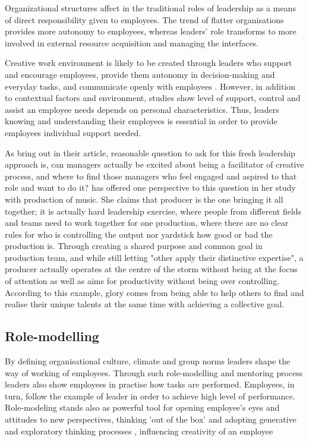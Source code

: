 Organizational structures affect in the traditional roles of leadership as a means of direct responsibility given to employees. The trend of flatter organisations provides more autonomy to employees, whereas leaders' role transforms to more involved in external resource acquisition and managing the interfaces. \citep{shalley2004leaders}

Creative work environment is likely to be created through leaders who support and encourage employees, provide them autonomy in decision-making and everyday tasks, and communicate openly with employees \citep{oldham1996employee,tierney1999examination}. However, in addition to contextual factors and environment, studies show level of support, control and assist an employee needs depends on personal characteristics. Thus, leaders knowing and understanding their employees is essential in order to provide employees individual support needed. \citep{shalley2004leaders}

 As \citet{garvin2008yours} bring out in their article, reasonable question to ask for this fresh leadership approach is, can managers actually be excited about being a facilitator of creative process, and where to find those managers who feel engaged and aspired to that role and want to do it? \citet{lingo2010nexus} has offered one perspective to this question in her study with production of music. She claims that producer is the one bringing it all together; it is actually hard leadership exercise, where people from different fields and teams need to work together for one production, where there are no clear rules for who is controlling the output nor yardstick how good or bad the production is. Through creating a shared purpose and common goal in production team, and while still letting "other apply their distinctive expertise", a producer actually operates at the centre of the storm without being at the focus of attention as well as aims for productivity without being over controlling. According to this example, glory comes from being able to help others to find and realise their unique talents at the same time with achieving a collective goal. 
 
\subsection{Role-modelling}
By defining organisational culture, climate and group norms leaders shape the way of working of employees. Through such role-modelling and mentoring process leaders also show employees in practise how tasks are performed. Employees, in turn, follow the example of leader in order to achieve high level of performance. \citep{redmond1993putting} Role-modeling stands also as powerful tool for opening employee's eyes and attitudes to new perspectives, thinking 'out of the box' and adopting generative and exploratory thinking processes \citep{jung2003role,sternberg1997creativity}, influencing creativity of an employee \citep{shalley2004leaders}

